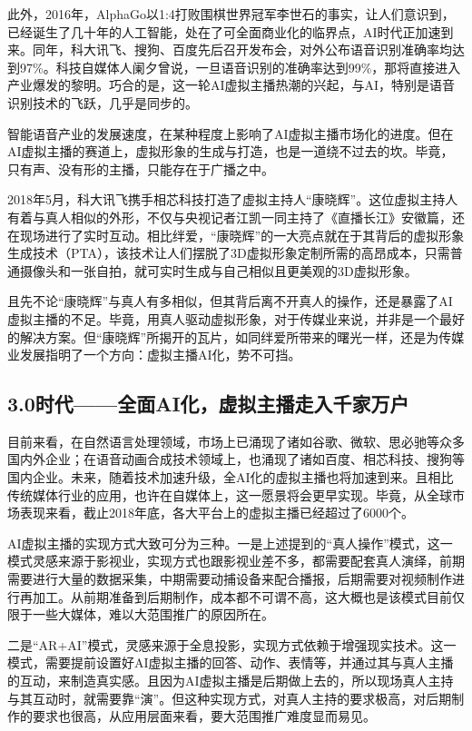 \documentclass[11pt, a4paper, oneside]{ctexbook}
\begin{document}
此外，2016年，AlphaGo以1:4打败围棋世界冠军李世石的事实，让人们意识到，已经诞生了几十年的人工智能，处在了可全面商业化的临界点，AI时代正加速到来。同年，科大讯飞、搜狗、百度先后召开发布会，对外公布语音识别准确率均达到97\%。科技自媒体人阑夕曾说，一旦语音识别的准确率达到99\%，那将直接进入产业爆发的黎明。巧合的是，这一轮AI虚拟主播热潮的兴起，与AI，特别是语音识别技术的飞跃，几乎是同步的。

智能语音产业的发展速度，在某种程度上影响了AI虚拟主播市场化的进度。但在AI虚拟主播的赛道上，虚拟形象的生成与打造，也是一道绕不过去的坎。毕竟，只有声、没有形的主播，只能存在于广播之中。

2018年5月，科大讯飞携手相芯科技打造了虚拟主持人“康晓辉”。这位虚拟主持人有着与真人相似的外形，不仅与央视记者江凯一同主持了《直播长江》安徽篇，还在现场进行了实时互动。相比绊爱，“康晓辉”的一大亮点就在于其背后的虚拟形象生成技术（PTA），该技术让人们摆脱了3D虚拟形象定制所需的高昂成本，只需普通摄像头和一张自拍，就可实时生成与自己相似且更美观的3D虚拟形象。

且先不论“康晓辉”与真人有多相似，但其背后离不开真人的操作，还是暴露了AI虚拟主播的不足。毕竟，用真人驱动虚拟形象，对于传媒业来说，并非是一个最好的解决方案。但“康晓辉”所揭开的瓦片，如同绊爱所带来的曙光一样，还是为传媒业发展指明了一个方向：虚拟主播AI化，势不可挡。

\subsection{3.0时代——全面AI化，虚拟主播走入千家万户}
目前来看，在自然语言处理领域，市场上已涌现了诸如谷歌、微软、思必驰等众多国内外企业；在语音动画合成技术领域上，也涌现了诸如百度、相芯科技、搜狗等国内企业。未来，随着技术加速升级，全AI化的虚拟主播也将加速到来。且相比传统媒体行业的应用，也许在自媒体上，这一愿景将会更早实现。毕竟，从全球市场表现来看，截止2018年底，各大平台上的虚拟主播已经超过了6000个。

AI虚拟主播的实现方式大致可分为三种。一是上述提到的“真人操作”模式，这一模式灵感来源于影视业，实现方式也跟影视业差不多，都需要配套真人演绎，前期需要进行大量的数据采集，中期需要动捕设备来配合播报，后期需要对视频制作进行再加工。从前期准备到后期制作，成本都不可谓不高，这大概也是该模式目前仅限于一些大媒体，难以大范围推广的原因所在。

二是“AR+AI”模式，灵感来源于全息投影，实现方式依赖于增强现实技术。这一模式，需要提前设置好AI虚拟主播的回答、动作、表情等，并通过其与真人主播的互动，来制造真实感。且因为AI虚拟主播是后期做上去的，所以现场真人主持与其互动时，就需要靠“演”。但这种实现方式，对真人主持的要求极高，对后期制作的要求也很高，从应用层面来看，要大范围推广难度显而易见。
\end{document}

